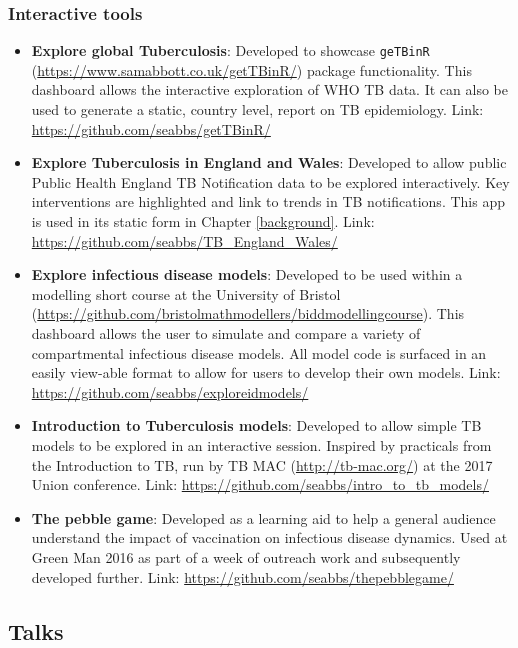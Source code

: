 \documentclass[11pt,twoside]{bristolthesis}
\begin{document}
  \hypertarget{interactive-tools}{%
  \subsubsection{Interactive tools}\label{interactive-tools}}
  \begin{itemize}
  \item
    \textbf{Explore global Tuberculosis}: Developed to showcase \texttt{geTBinR} (\url{https://www.samabbott.co.uk/getTBinR/}) package functionality. This dashboard allows the interactive exploration of WHO TB data. It can also be used to generate a static, country level, report on TB epidemiology. Link: \url{https://github.com/seabbs/getTBinR/}
  \item
    \textbf{Explore Tuberculosis in England and Wales}: Developed to allow public Public Health England TB Notification data to be explored interactively. Key interventions are highlighted and link to trends in TB notifications. This app is used in its static form in Chapter \ref{background}. Link: \url{https://github.com/seabbs/TB_England_Wales/}
  \item
    \textbf{Explore infectious disease models}: Developed to be used within a modelling short course at the University of Bristol (\url{https://github.com/bristolmathmodellers/biddmodellingcourse}). This dashboard allows the user to simulate and compare a variety of compartmental infectious disease models. All model code is surfaced in an easily view-able format to allow for users to develop their own models. Link: \url{https://github.com/seabbs/exploreidmodels/}
  \item
    \textbf{Introduction to Tuberculosis models}: Developed to allow simple TB models to be explored in an interactive session. Inspired by practicals from the Introduction to TB, run by TB MAC (\url{http://tb-mac.org/}) at the 2017 Union conference. Link: \url{https://github.com/seabbs/intro_to_tb_models/}
  \item
    \textbf{The pebble game}: Developed as a learning aid to help a general audience understand the impact of vaccination on infectious disease dynamics. Used at Green Man 2016 as part of a week of outreach work and subsequently developed further. Link: \url{https://github.com/seabbs/thepebblegame/}
  \end{itemize}
  \hypertarget{talks}{%
  \subsection{Talks}\label{talks}}
\end{document}
